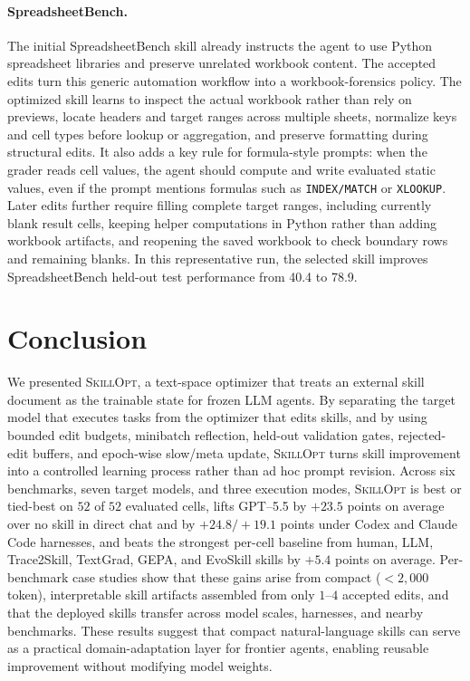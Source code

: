 \documentclass{llmxive}
\providecommand{\ourmethod}{\textsc{SkillOpt}\xspace}
\begin{document}
\paragraph{SpreadsheetBench.}
The initial SpreadsheetBench skill already instructs the agent to use Python spreadsheet libraries and preserve unrelated workbook content. The accepted edits turn this generic automation workflow into a workbook-forensics policy. The optimized skill learns to inspect the actual workbook rather than rely on previews, locate headers and target ranges across multiple sheets, normalize keys and cell types before lookup or aggregation, and preserve formatting during structural edits. It also adds a key rule for formula-style prompts: when the grader reads cell values, the agent should compute and write evaluated static values, even if the prompt mentions formulas such as \texttt{INDEX/MATCH} or \texttt{XLOOKUP}. Later edits further require filling complete target ranges, including currently blank result cells, keeping helper computations in Python rather than adding workbook artifacts, and reopening the saved workbook to check boundary rows and remaining blanks. In this representative run, the selected skill improves SpreadsheetBench held-out test performance from 40.4 to 78.9.


\FloatBarrier
\section{Conclusion}

We presented \ourmethod{}, a text-space optimizer that treats an external skill document as the trainable state for frozen LLM agents. By separating the target model that executes tasks from the optimizer that edits skills, and by using bounded edit budgets, minibatch reflection, held-out validation gates, rejected-edit buffers, and epoch-wise slow/meta update, \ourmethod{} turns skill improvement into a controlled learning process rather than ad hoc prompt revision. Across six benchmarks, seven target models, and three execution modes, \ourmethod{} is best or tied-best on $52$ of $52$ evaluated cells, lifts GPT--5.5 by $+23.5$ points on average over no skill in direct chat and by $+24.8 / +19.1$ points under Codex and Claude Code harnesses, and beats the strongest per-cell baseline from human, LLM, Trace2Skill, TextGrad, GEPA, and EvoSkill skills by $+5.4$ points on average. Per-benchmark case studies show that these gains arise from compact ($<2{,}000$ token), interpretable skill artifacts assembled from only $1$--$4$ accepted edits, and that the deployed skills transfer across model scales, harnesses, and nearby benchmarks. These results suggest that compact natural-language skills can serve as a practical domain-adaptation layer for frontier agents, enabling reusable improvement without modifying model weights.
\end{document}
